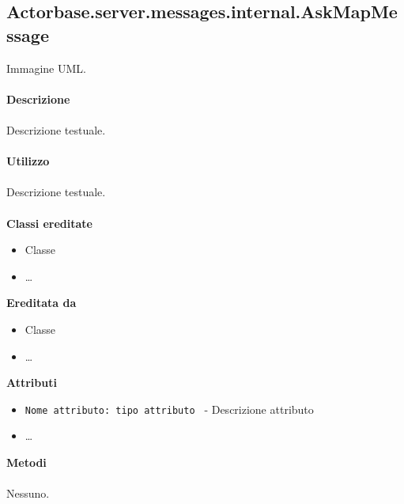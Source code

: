 \documentclass[a4paper]{article}
\begin{document}
	\subsection{Actorbase.server.messages.internal.AskMapMessage}
		Immagine UML.
		\\ \\
		\textbf{Descrizione}
			\\ \\
			Descrizione testuale.
			\\ \\
		\textbf{Utilizzo}
			\\ \\
			Descrizione testuale.
			\\ \\
		\textbf{Classi ereditate}
			\begin{itemize}
				\item Classe
				\item \dots
			\end{itemize}
		\textbf{Ereditata da}
			\begin{itemize}
				\item Classe
				\item \dots
			\end{itemize}
		\textbf{Attributi}
			\begin{itemize}
				\item \texttt{Nome attributo: tipo attributo } - Descrizione attributo
				\item \dots
			\end{itemize}
		\textbf{Metodi}
			\\ \\
			Nessuno.
			
\end{document}
